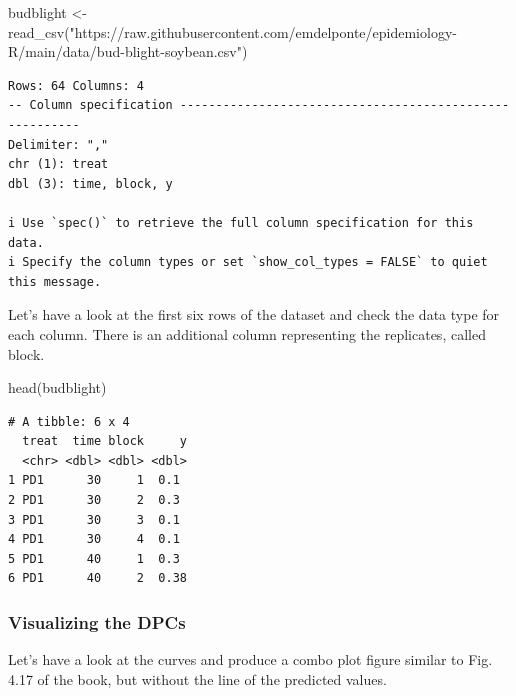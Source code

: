 \documentclass[
  letterpaper,
  DIV=11,
  numbers=noendperiod]{scrreprt}
\newenvironment{Shaded}{\begin{snugshade}}{\end{snugshade}}
\newcommand{\FunctionTok}[1]{\textcolor[rgb]{0.28,0.35,0.67}{#1}}
\newcommand{\NormalTok}[1]{\textcolor[rgb]{0.00,0.23,0.31}{#1}}
\newcommand{\OtherTok}[1]{\textcolor[rgb]{0.00,0.23,0.31}{#1}}
\newcommand{\StringTok}[1]{\textcolor[rgb]{0.13,0.47,0.30}{#1}}
\begin{document}
\begin{Shaded}
\begin{Highlighting}[]
\NormalTok{budblight }\OtherTok{\textless{}{-}} \FunctionTok{read\_csv}\NormalTok{(}\StringTok{"https://raw.githubusercontent.com/emdelponte/epidemiology{-}R/main/data/bud{-}blight{-}soybean.csv"}\NormalTok{)}
\end{Highlighting}
\end{Shaded}

\begin{verbatim}
Rows: 64 Columns: 4
-- Column specification --------------------------------------------------------
Delimiter: ","
chr (1): treat
dbl (3): time, block, y

i Use `spec()` to retrieve the full column specification for this data.
i Specify the column types or set `show_col_types = FALSE` to quiet this message.
\end{verbatim}

Let's have a look at the first six rows of the dataset and check the
data type for each column. There is an additional column representing
the replicates, called block.

\begin{Shaded}
\begin{Highlighting}[]
\FunctionTok{head}\NormalTok{(budblight)}
\end{Highlighting}
\end{Shaded}

\begin{verbatim}
# A tibble: 6 x 4
  treat  time block     y
  <chr> <dbl> <dbl> <dbl>
1 PD1      30     1  0.1 
2 PD1      30     2  0.3 
3 PD1      30     3  0.1 
4 PD1      30     4  0.1 
5 PD1      40     1  0.3 
6 PD1      40     2  0.38
\end{verbatim}

\hypertarget{visualizing-the-dpcs}{%
\subsubsection{Visualizing the DPCs}\label{visualizing-the-dpcs}}

Let's have a look at the curves and produce a combo plot figure similar
to Fig. 4.17 of the book, but without the line of the predicted values.
\end{document}
